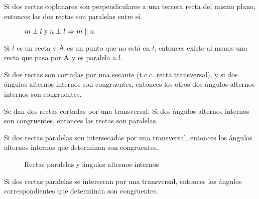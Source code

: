\clearpage

\begin{theorem}
    Si dos rectas coplanares son perpendiculares a una tercera recta del mismo plano, entonces las dos rectas son paralelas entre sí.

    \begin{figure}[!h]
        \centering
        
        \caption{$m \perp l \;\text{y}\; n \perp l \Rightarrow m \parallel n$}
        \label{fig:paralelas-entre-si}
    \end{figure}
    
\end{theorem}

\begin{theorem}
    Si $l$ es un recta y $\rm A$ es un punto que no está en $l$, entonces existe al menos una recta que pasa por $\rm A$ y es paralela a $l$.
\end{theorem}

\begin{theorem}
    Si dos rectas son cortadas por una secante (t.c.c. recta transversal), y si dos ángulos alternos internos son congruentes, entonces los otros dos ángulos alternos internos son congruentes.
\end{theorem}

\begin{theorem}
    Se dan dos rectas cortadas por una transversal. Si dos ángulos alternos internos son congruentes, entonces las rectas son paralelas.
\end{theorem}

\clearpage

\begin{theorem}
    Si dos rectas paralelas son intersecadas por una transversal, entonces los ángulos alternos internos que determinan son congruentes.
\end{theorem}

\begin{figure}[!h]
    \centering
    
    \caption{Rectas paralelas y ángulos alternos internos}
    \label{fig:theorem7}
\end{figure}

\begin{theorem}
    Si dos rectas paralelas se intersecan por una transversal, entonces los ángulos correspondientes que determinan son congruentes.
\end{theorem}

